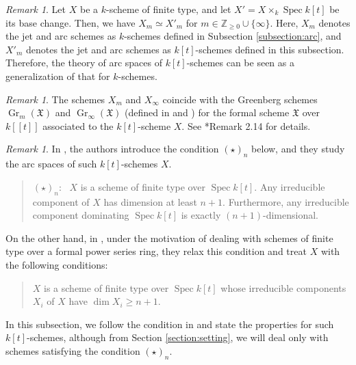 \documentclass[a4paper,11pt]{amsart}
\theoremstyle{definition}
\theoremstyle{remark}
\newtheorem{rmk}[thm]{Remark}
\begin{document}
\begin{rmk}\label{rmk:bc}
Let $X$ be a $k$-scheme of finite type, and let $X' = X \times _{k} \operatorname{Spec} k[t]$ be its base change. 
Then, we have $X_m \simeq X'_m$ for $m\in \mathbb Z_{\ge 0} \cup \{ \infty \}$. 
Here, $X_m$ denotes the jet and arc schemes as $k$-schemes defined in Subsection \ref{subsection:arc}, and $X'_m$ denotes the jet and arc schemes as $k[t]$-schemes defined in this subsection. Therefore, the theory of arc spaces of $k[t]$-schemes can be seen as a generalization of that for $k$-schemes. 
\end{rmk}

\begin{rmk}\label{rmk:GB}
The schemes $X_m$ and $X_{\infty}$ coincide with the Greenberg schemes $\operatorname{Gr}_m(\mathfrak{X})$ and $\operatorname{Gr}_{\infty}(\mathfrak{X})$ (defined in \cite{Seb04} and \cite{CLNS}) for the formal scheme $\mathfrak{X}$ over $k[[t]]$ associated to the $k[t]$-scheme $X$. See \cite{NS22}*{Remark 2.14} for details.
\end{rmk}


\begin{rmk}
In \cite{NS22}, the authors introduce the condition $(\star)_n$ below, and they study the arc spaces of such $k[t]$-schemes $X$.   
\begin{quote}
$(\star)_n$: \ $X$ is a scheme of finite type over $\operatorname{Spec} k[t]$. 
Any irreducible component of $X$ has dimension at least $n+1$. 
Furthermore, any irreducible component dominating $\operatorname{Spec} k[t]$ is exactly $(n+1)$-dimensional.
\end{quote}
On the other hand, in \cite{NS2}, 
under the motivation of dealing with schemes of finite type over a formal power series ring, 
they relax this condition and treat $X$ with the following conditions:
\begin{quote}
$X$ is a scheme of finite type over $\operatorname{Spec} k[t]$ whose
irreducible components $X_i$ of $X$ have $\dim  X_i \ge n+1$.
\end{quote}
In this subsection, we follow the condition in \cite{NS2} and state the properties for such $k[t]$-schemes, although from Section \ref{section:setting}, we will deal only with schemes satisfying the condition $(\star)_n$.
\end{rmk}
\end{document}
